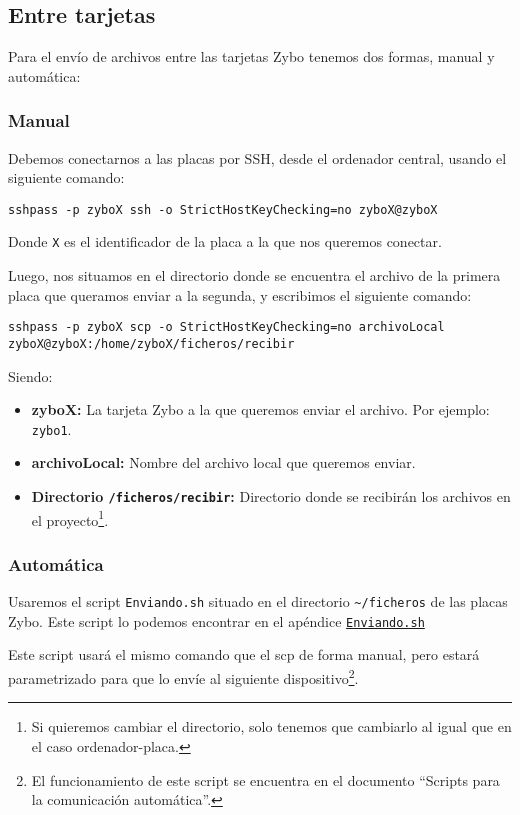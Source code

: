 \newpage
\subsection{Entre tarjetas}
Para el envío de archivos entre las tarjetas Zybo tenemos dos formas, manual y automática:

\subsubsection{Manual}
Debemos conectarnos a las placas por SSH, desde el ordenador central, usando el siguiente comando:
\begin{center}
	\texttt{sshpass -p zyboX ssh -o StrictHostKeyChecking=no zyboX@zyboX}
\end{center}
Donde \texttt{X} es el identificador de la placa a la que nos queremos conectar.

Luego, nos situamos en el directorio donde se encuentra el archivo de la primera placa que queramos enviar a la segunda, y escribimos el siguiente comando:
\begin{center}
	\texttt{sshpass -p zyboX scp -o StrictHostKeyChecking=no archivoLocal zyboX@zyboX:/home/zyboX/ficheros/recibir}
\end{center}
Siendo:
\begin{itemize}
	\item \textbf{zyboX:} La tarjeta Zybo a la que queremos enviar el archivo. Por ejemplo: \texttt{zybo1}.
	\item \textbf{archivoLocal:} Nombre del archivo local que queremos enviar.
	\item \textbf{Directorio \texttt{/ficheros/recibir}:} Directorio donde se recibirán los archivos en el proyecto\footnote{Si quieremos cambiar el directorio, solo tenemos que cambiarlo al igual que en el caso ordenador-placa.}.
\end{itemize}

\subsubsection{Automática}
Usaremos el script \texttt{Enviando.sh} situado en el directorio \texttt{\textasciitilde{}/ficheros} de las placas Zybo.
Este script lo podemos encontrar en el apéndice \hyperlink{ScriptEnviando}{\texttt{Enviando.sh}}

Este script usará el mismo comando que el scp de forma manual, pero estará parametrizado para que lo envíe al siguiente dispositivo\footnote{El funcionamiento de este script se encuentra en el documento ``Scripts para la comunicación automática''.}.